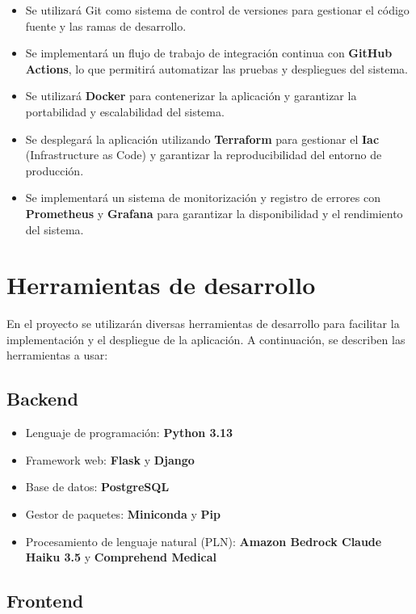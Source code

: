 \begin{itemize}
    \item Se utilizará Git como sistema de control de versiones para gestionar el código fuente y las ramas de desarrollo.
    \item Se implementará un flujo de trabajo de integración continua con \textbf{GitHub Actions}, lo que permitirá automatizar las pruebas y despliegues del sistema.
    \item Se utilizará \textbf{Docker} para contenerizar la aplicación y garantizar la portabilidad y escalabilidad del sistema.
    \item Se desplegará la aplicación utilizando \textbf{Terraform} para gestionar el \textbf{Iac} (Infrastructure as Code) y garantizar la reproducibilidad del entorno de producción.
    \item Se implementará un sistema de monitorización y registro de errores con \textbf{Prometheus} y \textbf{Grafana} para garantizar la disponibilidad y el rendimiento del sistema.
\end{itemize}

\section{Herramientas de desarrollo}

En el proyecto se utilizarán diversas herramientas de desarrollo para facilitar la implementación y el despliegue de la aplicación. A continuación, se describen las herramientas a usar:

\subsection{Backend}

\begin{itemize}
    \item Lenguaje de programación: \textbf{Python 3.13}
    \item Framework web: \textbf{Flask} y \textbf{Django}
    \item Base de datos: \textbf{PostgreSQL}
    \item Gestor de paquetes: \textbf{Miniconda} y \textbf{Pip}
    \item Procesamiento de lenguaje natural (PLN): \textbf{Amazon Bedrock Claude Haiku 3.5} y \textbf{Comprehend Medical}
\end{itemize}

\subsection{Frontend}

